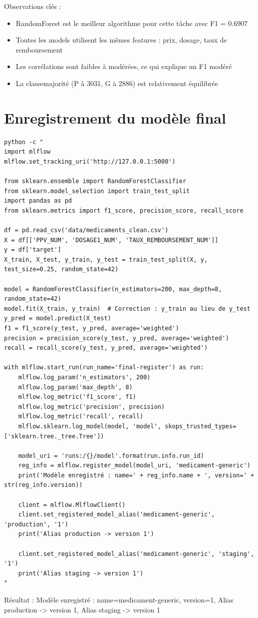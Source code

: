 \documentclass[12pt,a4paper]{report}
\begin{document}
Observations clés :
\begin{itemize}
    \item RandomForest est le meilleur algorithme pour cette tâche avec F1 = 0.6907
    \item Toutes les models utilisent les mêmes features : prix, dosage, taux de remboursement
    \item Les corrélations sont faibles à modérées, ce qui explique un F1 modéré
    \item La classemajorité (P à 3031, G à 2886) est relativement équilibrée
\end{itemize}

\section{Enregistrement du modèle final}
\begin{verbatim}
python -c "
import mlflow
mlflow.set_tracking_uri('http://127.0.0.1:5000')

from sklearn.ensemble import RandomForestClassifier
from sklearn.model_selection import train_test_split
import pandas as pd
from sklearn.metrics import f1_score, precision_score, recall_score

df = pd.read_csv('data/medicaments_clean.csv')
X = df[['PPV_NUM', 'DOSAGE1_NUM', 'TAUX_REMBOURSEMENT_NUM']]
y = df['target']
X_train, X_test, y_train, y_test = train_test_split(X, y, test_size=0.25, random_state=42)

model = RandomForestClassifier(n_estimators=200, max_depth=8, random_state=42)
model.fit(X_train, y_train)  # Correction : y_train au lieu de y_test
y_pred = model.predict(X_test)
f1 = f1_score(y_test, y_pred, average='weighted')
precision = precision_score(y_test, y_pred, average='weighted')
recall = recall_score(y_test, y_pred, average='weighted')

with mlflow.start_run(run_name='final-register') as run:
    mlflow.log_param('n_estimators', 200)
    mlflow.log_param('max_depth', 8)
    mlflow.log_metric('f1_score', f1)
    mlflow.log_metric('precision', precision)
    mlflow.log_metric('recall', recall)
    mlflow.sklearn.log_model(model, 'model', skops_trusted_types=['sklearn.tree._tree.Tree'])
    
    model_uri = 'runs:/{}/model'.format(run.info.run_id)
    reg_info = mlflow.register_model(model_uri, 'medicament-generic')
    print('Modèle enregistré : name=' + reg_info.name + ', version=' + str(reg_info.version))
    
    client = mlflow.MlflowClient()
    client.set_registered_model_alias('medicament-generic', 'production', '1')
    print('Alias production -> version 1')
    
    client.set_registered_model_alias('medicament-generic', 'staging', '1')
    print('Alias staging -> version 1')
"
\end{verbatim}
Résultat : Modèle enregistré : name=medicament-generic, version=1, Alias production -> version 1, Alias staging -> version 1
\end{document}
